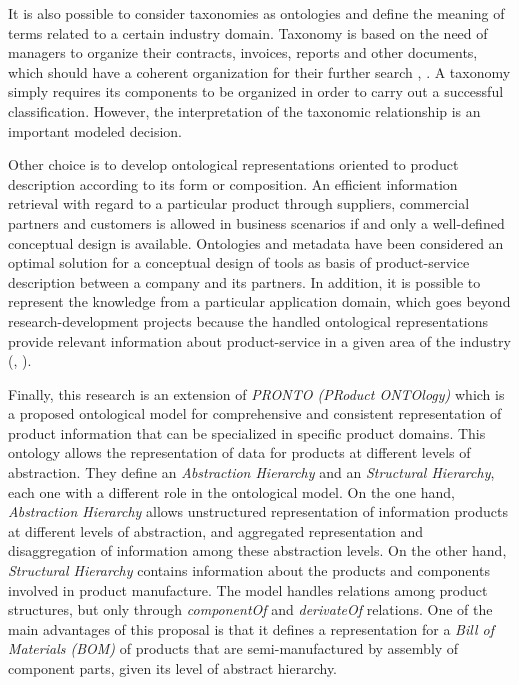 \documentclass[runningheads,a4paper]{llncs}
\begin{document}
It is also possible to consider taxonomies as ontologies and define the meaning of terms related to a certain industry domain. Taxonomy is based on the need of managers to organize their contracts, invoices, reports and other documents, which should have a coherent organization for their further search \cite{wemmerlov1990taxonomy}, \cite{diaz1998semi}. A taxonomy simply requires its components to be organized in order to carry out a successful classification. However, the interpretation of the taxonomic relationship is an important modeled decision.  

Other choice is to develop ontological representations oriented to product description according to its form or composition. An efficient information retrieval with regard to a particular product through suppliers, commercial partners and customers is allowed in business scenarios if and only a well-defined conceptual design is available. Ontologies and metadata have been considered an optimal solution for a conceptual design of tools as basis of product-service description between a company and its partners. In addition, it is possible to represent the knowledge from a particular application domain, which goes beyond research-development projects because the handled ontological representations provide relevant information about product-service in a given area of the industry (\cite{vegetti2011pronto}, \cite{nederstigt2014floppies}). 

Finally, this research is an extension of \textit{PRONTO (PRoduct ONTOlogy)}\cite{vegetti2011pronto} which is a proposed ontological model for comprehensive and consistent representation of product information that can be specialized in specific product domains.
This ontology allows the representation of data for products at different levels of abstraction. They define an \textit{Abstraction Hierarchy} and an \textit{Structural Hierarchy}, each one with a different role in the ontological model. On the one hand, \textit{Abstraction Hierarchy} allows unstructured representation of information products at different levels of abstraction, and aggregated representation and disaggregation of information among these abstraction levels. On the other hand, \textit{Structural Hierarchy} contains information about the products and components involved in product manufacture. The model handles relations among product structures, but only through \textit{componentOf} and \textit{derivateOf} relations. One of the main advantages of this proposal is that it defines a representation for a \emph{Bill of Materials (BOM)} of products that are semi-manufactured by assembly of component parts, given its level of abstract hierarchy.  
\end{document}
